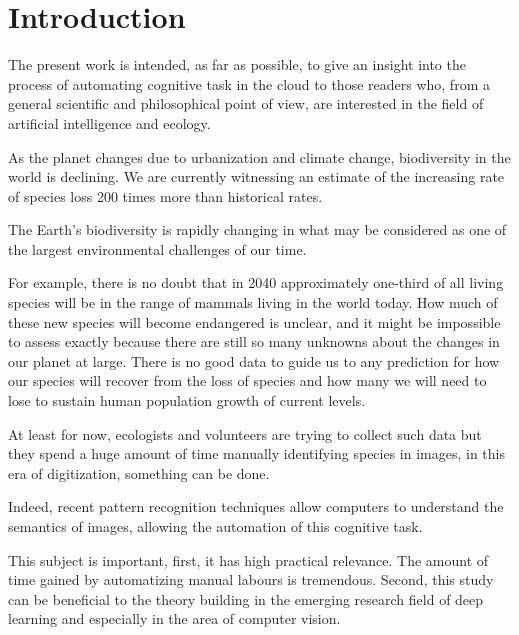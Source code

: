 
\chapter{Introduction}

The present work is intended, as far as possible, to give an insight into the process of automating cognitive task in the cloud to those readers who, from a general scientific and philosophical point of view, are interested in the field of artificial intelligence and ecology.

As the planet changes due to urbanization and climate change, biodiversity in the world is declining. We are currently witnessing an estimate of the increasing rate of species loss 200 times more than historical rates\cite{cop21_1}. 

The Earth's biodiversity is rapidly changing in what may be considered as one of the largest environmental challenges of our time.

For example, there is no doubt that in 2040 approximately one-third of all living species will be in the range of mammals living in the world today. How much of these new species will become endangered is unclear, and it might be impossible to assess exactly because there are still so many unknowns about the changes in our planet at large. There is no good data to guide us to any prediction for how our species will recover from the loss of species and how many we will need to lose to sustain human population growth of current levels.

At least for now, ecologists and volunteers are trying to collect such data but they spend a huge amount of time manually identifying species in images, in this era of digitization, something can be done.

Indeed, recent pattern recognition techniques allow computers to understand the semantics of images, allowing the automation of this cognitive task.

This subject is important, first, it has high practical relevance. The amount of time gained by automatizing manual labours is tremendous. Second, this study can be beneficial to the theory building in the emerging research field of deep learning and especially in the area of computer vision.

